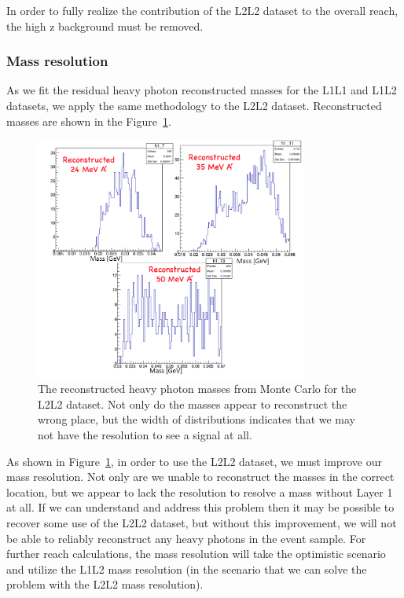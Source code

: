 \documentclass[twoside]{article}
\begin{document}
In order to fully realize the contribution of the L2L2 dataset to the overall reach, the high z background must be removed. 

\subsubsection{Mass resolution}

As we fit the residual heavy photon reconstructed masses for the L1L1 and L1L2 datasets, we apply the same methodology to the L2L2 dataset. Reconstructed masses are shown in the Figure~\ref{fig:l2l2_mfit}.

\begin{figure}[H]
  \centering
     \includegraphics[width=0.8\textwidth]{plots/L2L2MassFit.png}
  \caption{The reconstructed heavy photon masses from Monte Carlo for the L2L2 dataset. Not only do the masses appear to reconstruct the wrong place, but the width of distributions indicates that we may not have the resolution to see a signal at all.}
  \label{fig:l2l2_mfit}
\end{figure} 

As shown in Figure~\ref{fig:l2l2_mfit}, in order to use the L2L2 dataset, we must improve our mass resolution. Not only are we unable to reconstruct the masses in the correct location, but we appear to lack the resolution to resolve a mass without Layer 1 at all. If we can understand and address this problem then it may be possible to recover some use of the L2L2 dataset, but without this improvement, we will not be able to reliably reconstruct any heavy photons in the event sample. For further reach calculations, the mass resolution will take the optimistic scenario and utilize the L1L2 mass resolution (in the scenario that we can solve the problem with the L2L2 mass resolution). 
\end{document}
